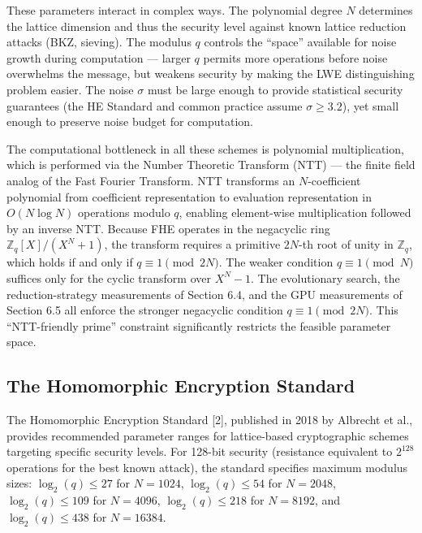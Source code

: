 These parameters interact in complex ways. The polynomial degree \(N\) determines the lattice dimension and thus the security level against known lattice reduction attacks (BKZ, sieving). The modulus \(q\) controls the ``space'' available for noise growth during computation --- larger \(q\) permits more operations before noise overwhelms the message, but weakens security by making the LWE distinguishing problem easier. The noise \(\sigma\) must be large enough to provide statistical security guarantees (the HE Standard and common practice assume \(\sigma \geq 3.2\)), yet small enough to preserve noise budget for computation.

The computational bottleneck in all these schemes is polynomial multiplication, which is performed via the Number Theoretic Transform (NTT) --- the finite field analog of the Fast Fourier Transform. NTT transforms an \(N\)-coefficient polynomial from coefficient representation to evaluation representation in \(O(N \log N)\) operations modulo \(q\), enabling element-wise multiplication followed by an inverse NTT. Because FHE operates in the negacyclic ring \(\mathbb{Z}_q[X]/(X^N + 1)\), the transform requires a primitive \(2N\)-th root of unity in \(\mathbb{Z}_q\), which holds if and only if \(q \equiv 1 \pmod{2N}\). The weaker condition \(q \equiv 1 \pmod{N}\) suffices only for the cyclic transform over \(X^N - 1\). The evolutionary search, the reduction-strategy measurements of Section 6.4, and the GPU measurements of Section 6.5 all enforce the stronger negacyclic condition \(q \equiv 1 \pmod{2N}\). This ``NTT-friendly prime'' constraint significantly restricts the feasible parameter space.

\subsection{The Homomorphic Encryption Standard}\label{the-homomorphic-encryption-standard}

The Homomorphic Encryption Standard [2], published in 2018 by Albrecht et al., provides recommended parameter ranges for lattice-based cryptographic schemes targeting specific security levels. For 128-bit security (resistance equivalent to \(2^{128}\) operations for the best known attack), the standard specifies maximum modulus sizes: \(\log_2(q) \leq 27\) for \(N = 1024\), \(\log_2(q) \leq 54\) for \(N = 2048\), \(\log_2(q) \leq 109\) for \(N = 4096\), \(\log_2(q) \leq 218\) for \(N = 8192\), and \(\log_2(q) \leq 438\) for \(N = 16384\).

